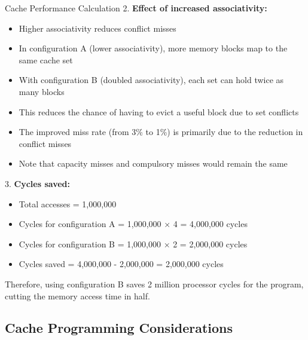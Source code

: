\begin{example2}{Cache Performance Calculation}
2. \textbf{Effect of increased associativity:}
   \begin{itemize}
     \item Higher associativity reduces conflict misses
     \item In configuration A (lower associativity), more memory blocks map to the same cache set
     \item With configuration B (doubled associativity), each set can hold twice as many blocks
     \item This reduces the chance of having to evict a useful block due to set conflicts
     \item The improved miss rate (from 3\% to 1\%) is primarily due to the reduction in conflict misses
     \item Note that capacity misses and compulsory misses would remain the same
   \end{itemize}

3. \textbf{Cycles saved:}
   \begin{itemize}
     \item Total accesses = 1,000,000
     \item Cycles for configuration A = 1,000,000 × 4 = 4,000,000 cycles
     \item Cycles for configuration B = 1,000,000 × 2 = 2,000,000 cycles
     \item Cycles saved = 4,000,000 - 2,000,000 = 2,000,000 cycles
   \end{itemize}

Therefore, using configuration B saves 2 million processor cycles for the program, cutting the memory access time in half.
\end{example2}

\subsection{Cache Programming Considerations}

